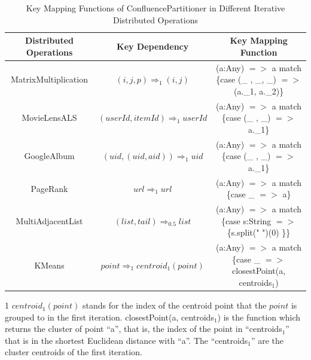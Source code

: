 \documentclass[10pt,journal,compsoc]{IEEEtran}
\begin{document}



\begin{table}[!t]
\centering
\begin{threeparttable}[b]
\renewcommand{\arraystretch}{1}
\caption{Key Mapping Functions of ConfluencePartitioner in Different Iterative Distributed Operations}
\label{table:code}
\centering
\begin{tabularx}{.85\textwidth}{ c || c |c  }
\hline
\textbf{Distributed Operations} & \textbf{Key Dependency} & \textbf{Key Mapping Function} \\
\hline
MatrixMultiplication & $(i,j,p) \Rightarrow_{1} (i,j)$ & (a:Any) $=>$ a match \{case (\_ , \_, \_) $=>$ (a.\_1, a.\_2)\}\\
\hline
MovieLensALS  &$(userId,itemId) \Rightarrow_{1} userId$ & (a:Any) $=>$ a match \{case (\_ , \_) $=>$ a.\_1\} \\%
\hline
GoogleAlbum  &$(uid,(uid,aid)) \Rightarrow_{1} uid$ & (a:Any) $=>$ a match \{case (\_ , \_) $=>$ a.\_1\} \\%
\hline
PageRank  &$url \Rightarrow_{1} url$ & (a:Any) $=>$ a match \{case \_ $=>$ a\} \\%
\hline
MultiAdjacentList  & $(list, tail) \Rightarrow_{0.5} list$ & (a:Any) $=>$ a match \{case s:String $=>$ \{s.split(" ")(0) \}\}\\
\hline
KMeans & $point \Rightarrow_1 centroid_1(point)$ & (a:Any) $=>$ a match \{case \_ $=>$ closestPoint(a, centroids$_1$)\tnote{1}\\
\hline
\end{tabularx}
\begin{tablenotes}
    \item[1] $centroid_1(point)$ stands for the index of the centroid point that the $point$ is grouped to in the first iteration.
    closestPoint(a, centroids$_1$) is the function which returns the cluster 
    of point ``a'', that is, the index of the point in ``centroids$_1$'' that is in the shortest Euclidean distance with ``a''. The ``centroids$_1$'' are the cluster centroids of the first iteration. 
  \end{tablenotes}
\end{threeparttable}
\end{table}
\end{document}
